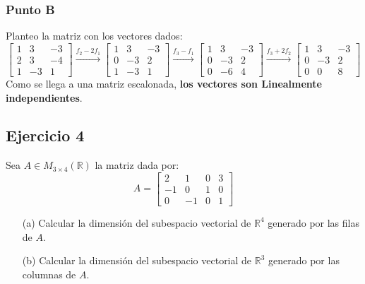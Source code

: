 \documentclass[a4paper,12pt]{article}
\begin{document}
\subsubsection{Punto B}
Planteo la matriz con los vectores dados:
$$
\begin{bmatrix}
1 & 3 & -3\\ 
2 & 3 & -4\\ 
1 & -3 & 1 
\end{bmatrix}
\xrightarrow[]{f_2-2f_1}
\begin{bmatrix}
1 & 3 & -3\\ 
0 & -3 & 2\\ 
1 & -3 & 1 
\end{bmatrix}
\xrightarrow[]{f_3-f_1}
\begin{bmatrix}
1 & 3 & -3\\ 
0 & -3 & 2\\ 
0 & -6 & 4 
\end{bmatrix}
\xrightarrow[]{f_3+2f_2}
\begin{bmatrix}
1 & 3 & -3\\ 
0 & -3 & 2\\ 
0 & 0 & 8 
\end{bmatrix}
$$
Como se llega a una matriz escalonada, \textbf{los vectores son Linealmente independientes}.
\subsection{Ejercicio 4}
Sea $A\in M_{3\times 4}(\mathds{R})$ la matriz dada por:
$$
A=\begin{bmatrix}
2 & 1 & 0 & 3\\ 
-1 & 0 & 1 & 0\\ 
0 & -1 & 0 & 1
\end{bmatrix}
$$
\begin{itemize}
    \item[(a)] Calcular la dimensión del subespacio vectorial de $\mathds{R}^4$ generado por las filas de $A$.
    \item[(b)] Calcular la dimensión del subespacio vectorial de $\mathds{R}^3$ generado por las columnas de $A$.
\end{itemize}
\end{document}
